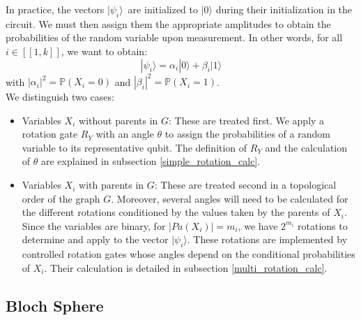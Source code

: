 In practice, the vectors $|\psi_i\rangle$\footnotemark \ are initialized to $|0\rangle$ during their initialization in the circuit. We must then assign them the appropriate amplitudes to obtain the probabilities of the random variable upon measurement. In other words, for all $i\in[\![1,k]\!]$, we want to obtain:
\[|\psi_i\rangle = \alpha_i|0\rangle + \beta_i|1\rangle\]
with $|\alpha_i|^2 = \mathbb{P}(X_i=0)$ and $|\beta_i|^2 = \mathbb{P}(X_i=1)$.
\\[5pt]
We distinguish two cases:
\begin{itemize}
\item Variables $X_i$ without parents in $G$: These are treated first. We apply a rotation gate $R_Y$ with an angle $\theta$ to assign the probabilities of a random variable to its representative qubit. The definition of $R_Y$ and the calculation of $\theta$ are explained in subsection \ref{simple_rotation_calc}.
\item Variables $X_i$ with parents in $G$: These are treated second in a topological order of the graph $G$. Moreover, several angles will need to be calculated for the different rotations conditioned by the values taken by the parents of $X_i$. Since the variables are binary, for $|Pa(X_i)|=m_i$, we have $2^{m_i}$ rotations to determine and apply to the vector $|\psi_i\rangle$. These rotations are implemented by controlled rotation gates whose angles depend on the conditional probabilities of $X_i$. Their calculation is detailed in subsection \ref{multi_rotation_calc}.
\end{itemize}

\subsection{Bloch Sphere}
\label{section_Bloch}


